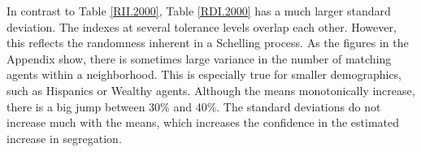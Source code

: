 \documentclass[11pt]{asaproc}
\newcommand{\1}{\mathbb{1}}
\begin{document}
In contrast to Table \ref{RII.2000}, Table \ref{RDI.2000} has a much larger standard deviation. The indexes at several tolerance levels overlap each other. However, this reflects the randomness inherent in a Schelling process. As the figures in the Appendix show, there is sometimes large variance in the number of matching agents within a neighborhood. This is especially true for smaller demographics, such as Hispanics or Wealthy agents. Although the means monotonically increase, there is a big jump between 30\% and 40\%. The standard deviations do not increase much with the means, which increases the confidence in the estimated increase in segregation.

\begin{table}[h!]
\centering
\caption[Racial Isolation, 2010 makeup of Chicago]{Racial Isolation Index for varying Tolerance levels in 2010 makeup of Chicago}
\label{RII.2010}
\end{table}
\end{document}
